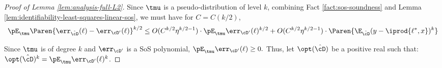 {%





  \begin{proof}[Proof of Lemma \ref{lem:analysis-full-L2}]
Since $\tmu$ is a pseudo-distribution of level $k$, combining Fact \ref{fact:sos-soundness} and Lemma \ref{lem:identifiability-least-squares-linear-sos}, we must have for $C = C(k/2)$,
\begin{equation} \label{eq:proof-to-pseudo-dist}
\pE_{\tmu} \Paren{\err_{\hat{\cD}}(\ell) - \err_{\cD'}(\ell)}^{k/2} \leq O(C^{k/2} \eta^{k/2-1}) \cdot \pE_{\tmu} \err_{\cD'}(\ell)^{k/2} + O(C^{k/2}\eta^{k/2-1}) \cdot \Paren{\E_{\hat{\cD}} (y-\iprod{\ell^{*},x})^k} 
\end{equation}

Since $\tmu$ is of degree $k$ and $\err_{\cD'}$ is a SoS polynomial, $\pE_{\tmu} \err_{\cD'}(\ell) \geq 0.$ Thus, let $\opt(\hat{\cD})$ be a positive real such that: $\opt(\hat{\cD})^k = \pE_{\tmu} \err_{\cD'}(\ell)^k$.


\end{proof}}
